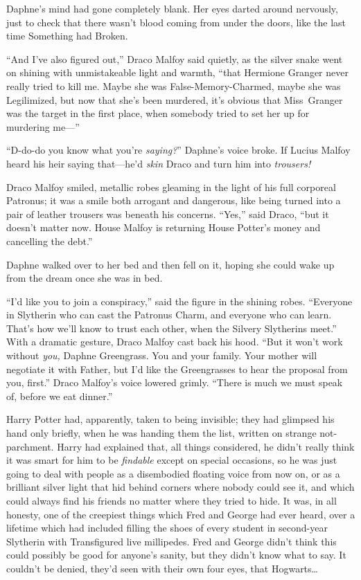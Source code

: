 Daphne’s mind had gone completely blank. Her eyes darted around nervously, just to check that there wasn’t blood coming from under the doors, like the last time Something had Broken.

“And I’ve also figured out,” Draco Malfoy said quietly, as the silver snake went on shining with unmistakeable light and warmth, “that Hermione Granger never really tried to kill me. Maybe she was False-Memory-Charmed, maybe she was Legilimized, but now that she’s been murdered, it’s obvious that Miss~Granger was the target in the first place, when somebody tried to set her up for murdering me—”

“D-do-do you know what you’re \emph{saying?}” Daphne’s voice broke. If Lucius Malfoy heard his heir saying that—he’d \emph{skin} Draco and turn him into \emph{trousers!}

Draco Malfoy smiled, metallic robes gleaming in the light of his full corporeal Patronus; it was a smile both arrogant and dangerous, like being turned into a pair of leather trousers was beneath his concerns. “Yes,” said Draco, “but it doesn’t matter now. House Malfoy is returning House Potter’s money and cancelling the debt.”

Daphne walked over to her bed and then fell on it, hoping she could wake up from the dream once she was in bed.

“I’d like you to join a conspiracy,” said the figure in the shining robes. “Everyone in Slytherin who can cast the Patronus Charm, and everyone who can learn. That’s how we’ll know to trust each other, when the Silvery Slytherins meet.” With a dramatic gesture, Draco Malfoy cast back his hood. “But it won’t work without \emph{you,} Daphne Greengrass. You and your family. Your mother will negotiate it with Father, but I’d like the Greengrasses to hear the proposal from you, first.” Draco Malfoy’s voice lowered grimly. “There is much we must speak of, before we eat dinner.”

\later

Harry Potter had, apparently, taken to being invisible; they had glimpsed his hand only briefly, when he was handing them the list, written on strange not-parchment. Harry had explained that, all things considered, he didn’t really think it was smart for him to be \emph{findable} except on special occasions, so he was just going to deal with people as a disembodied floating voice from now on, or as a brilliant silver light that hid behind corners where nobody could see it, and which could always find his friends no matter where they tried to hide. It was, in all honesty, one of the creepiest things which Fred and George had ever heard, over a lifetime which had included filling the shoes of every student in second-year Slytherin with Transfigured live millipedes. Fred and George didn’t think this could possibly be good for anyone’s sanity, but they didn’t know what to say. It couldn’t be denied, they’d seen with their own four eyes, that Hogwarts…

